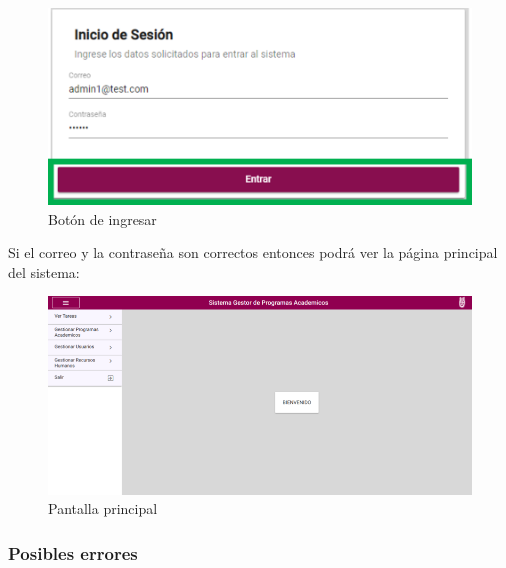         \begin{figure}[H]
            \centering
            \hypertarget{BotonIng}{\includegraphics[width=0.5\linewidth]{images/SP5/BotonIngresar}}
            \caption{Botón de ingresar}
        \end{figure}

        Si el correo y la contraseña son correctos entonces podrá ver la página principal del sistema:

        \begin{figure}[H]
            \centering
            \hypertarget{Principal}{\includegraphics[width=0.7\linewidth]{images/SP5/Principal}}
            \caption{Pantalla principal}
        \end{figure}

        \clearpage
        \subsubsection{Posibles errores}

